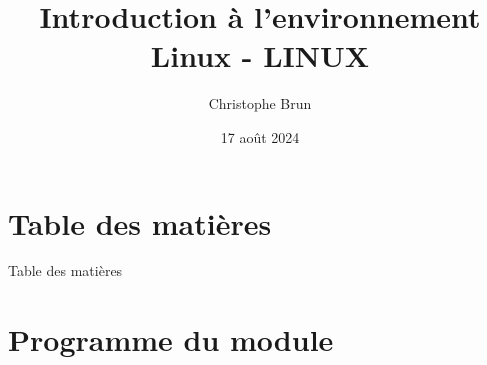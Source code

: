 \documentclass{beamer}
\title[LINUX]{Introduction à l'environnement Linux - LINUX}
\author{Christophe Brun}
\institute{Digicomp}
\date{17 août 2024}
\begin{document}
    \begin{frame}
        \titlepage
    \end{frame}


    \section{Table des matières}\label{sec:toc}

    \begin{frame}{Table des matières}
        \begin{tiny}
            \begin{multicols}{2}
                \tableofcontents
            \end{multicols}
        \end{tiny}
    \end{frame}


    \section{Programme du module}\label{sec:programme-du-module}
\end{document}
